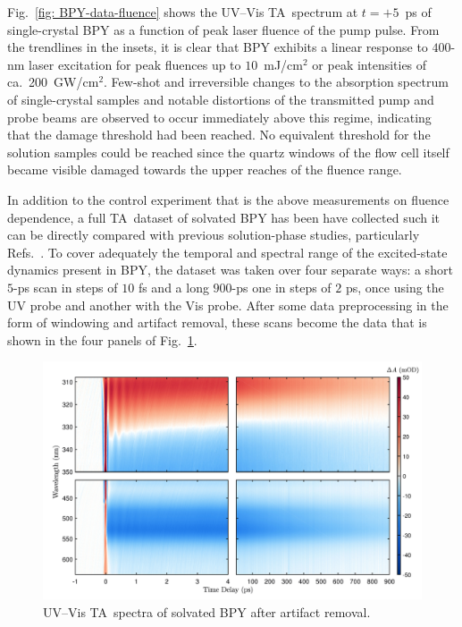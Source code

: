 Fig.~\ref{fig: BPY-data-fluence} shows the UV--Vis TA~spectrum at $t = +5$~ps of single-crystal BPY
as a function of peak laser fluence of the pump pulse.
From the trendlines in the insets,
it is clear that BPY exhibits a linear response to $400$-nm laser excitation
for peak fluences up to $10$~mJ/cm$^2$ or peak intensities of ca.~200~GW/cm$^2$.
%
Few-shot and irreversible changes to the absorption spectrum of
single-crystal samples and notable distortions of the transmitted pump and probe beams
are observed to occur immediately above this regime,
indicating that the damage threshold had been reached.
%
No equivalent threshold for the solution samples could be reached
since the quartz windows of the flow cell itself became visible damaged
towards the upper reaches of the fluence range.




In addition to the control experiment that is the above measurements on fluence dependence,
a full TA~dataset of solvated BPY has been have collected such it can be directly compared
with previous solution-phase studies, particularly Refs.~\cite{Gawelda2007a, Consani2009, Aubock2015}.
%
To cover adequately the temporal and spectral range of
the excited-state dynamics present in BPY,
the dataset was taken over four separate ways:
a short $5$-ps scan in steps of $10$ fs and
a long $900$-ps one in steps of $2$ ps,
once using the UV probe and another with the Vis probe.
%
After some data preprocessing in the form of windowing and artifact removal,
these scans become the data that is shown in the four panels of Fig.~\ref{fig: BPY-data-aqueous}.

\begin{figure}[ht!]
  \centering
  \includegraphics[width = \textwidth]{Figures/fig_BPY_data_aqueous.pdf}
  \caption[UV--Vis TA~spectra of solvated BPY.]{
    UV--Vis TA~spectra of solvated BPY after artifact removal.
  }
  \label{fig: BPY-data-aqueous}
\end{figure}

